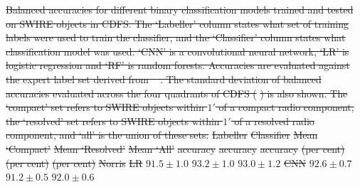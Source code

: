 \documentclass[11pt, a4paper]{book}
\providecommand{\DIFdeltex}[1]{{\protect\color{red}\sout{#1}}}                      %
\providecommand{\DIFdelFL}[1]{\DIFdel{#1}} %
\providecommand{\DIFdel}[1]{\texorpdfstring{\DIFdeltex{#1}}{}} %
\begin{document}
{%
\DIFdelFL{Balanced accuracies for different binary classification models trained and tested on SWIRE objects in CDFS.
    The `Labeller' column states what set of training labels
    were used to train the classifier, and the `Classifier' column states what
    classification model was used. `CNN' is a convolutional neural network,
    `LR' is logistic regression and `RF' is random forests. Accuracies are evaluated against the expert
    label set derived from \mbox{%
\citet{norris06}}\hspace{0pt}%
. The standard deviation of balanced accuracies evaluated across the four quadrants of
    CDFS (}%
\DIFdelFL{) is also shown. The `compact' set refers to SWIRE
    objects within $1'$ of a compact radio component, the `resolved' set refers to
    SWIRE objects within $1'$ of a resolved radio component, and `all' is the union of these sets.}}
\DIFdelFL{Labeller }%
\DIFdelFL{Classifier }%
\DIFdelFL{Mean `Compact' }%
\DIFdelFL{Mean `Resolved' }%
\DIFdelFL{Mean `All'}%
\DIFdelFL{accuracy }%
\DIFdelFL{accuracy }%
\DIFdelFL{accuracy}%
\DIFdelFL{(per cent) }%
\DIFdelFL{(per cent) }%
\DIFdelFL{(per cent)}%
\DIFdelFL{Norris }%
\DIFdelFL{LR }%
\DIFdelFL{$91.5 \pm 1.0$ }%
\DIFdelFL{$93.2 \pm 1.0$ }%
\DIFdelFL{$93.0 \pm 1.2$}%
\DIFdelFL{CNN }%
\DIFdelFL{$92.6 \pm 0.7$ }%
\DIFdelFL{$91.2 \pm 0.5$ }%
\DIFdelFL{$92.0 \pm 0.6$}%
\end{document}
